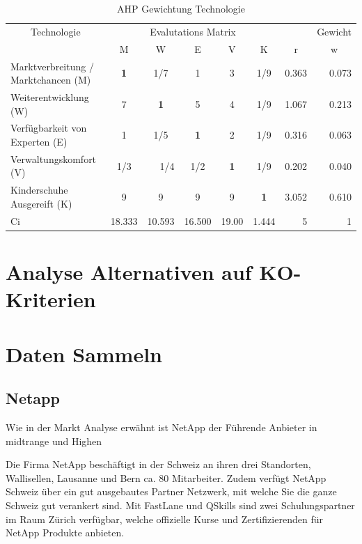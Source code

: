 \begin{table}[htbp]
\caption{AHP Gewichtung Technologie}
\begin{tabular}{|p{3.9cm}|c|c|c|c|c|r|r|}
\hline
\multicolumn{ 1}{|c|}{Technologie} & \multicolumn{ 5}{c|}{Evalutations Matrix} & \multicolumn{1}{l|}{} & \multicolumn{1}{l|}{Gewicht} \\ \cline{ 2- 8}
\multicolumn{ 1}{|c|}{} & M & W & E & V & K & \multicolumn{1}{c|}{r} & \multicolumn{1}{c|}{w} \\ \hline
Marktverbreitung / Marktchancen (M) & \textbf{1} &  1/7 & 1 & 3 &  1/9 & 0.363 & 0.073 \\ \hline
Weiterentwicklung (W) & 7 & \textbf{1} & 5 & 4 &  1/9 & 1.067 & 0.213 \\ \hline
Verfügbarkeit von Experten (E) & 1 &  1/5 & \textbf{1} & 2 &  1/9 & 0.316 & 0.063 \\ \hline
Verwaltungskomfort (V) &  1/3 & \multicolumn{1}{r|}{ 1/4} &  1/2 & \textbf{1} &  1/9 & 0.202 & 0.040 \\ \hline
Kinderschuhe Ausgereift (K) & 9 & 9 & 9 & 9 & \textbf{1} & 3.052 & 0.610 \\ \hline  \hline
Ci & \multicolumn{1}{r|}{18.333} & \multicolumn{1}{r|}{10.593} & \multicolumn{1}{r|}{16.500} & \multicolumn{1}{r|}{19.00} & \multicolumn{1}{r|}{1.444} & 5 & 1 \\ \hline
\end{tabular}
\label{AHPTechnologie}
\end{table}


\section{Analyse Alternativen auf KO-Kriterien}

\section{Daten Sammeln}
\subsection{Netapp}

Wie in der Markt Analyse erwähnt ist NetApp der Führende Anbieter in midtrange und Highen

Die Firma NetApp beschäftigt in  der Schweiz an ihren drei Standorten, Wallisellen, Lausanne und Bern ca. 80 Mitarbeiter. Zudem verfügt NetApp Schweiz über ein gut ausgebautes Partner Netzwerk, mit welche Sie die ganze Schweiz gut verankert sind. Mit FastLane und QSkills sind zwei Schulungspartner im Raum Zürich verfügbar, welche offizielle Kurse und Zertifizierenden für NetApp Produkte anbieten. 

